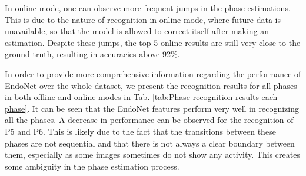 \documentclass[journal]{IEEEtran} \usepackage{amssymb}
\begin{document}
In online mode, one can observe more frequent jumps in the phase estimations. This is due to the nature of recognition in online mode, where future data is unavailable, so that the model is allowed to correct itself after making an estimation. Despite these jumps, the top-5 online results are still very close to the ground-truth, resulting in accuracies above 92\%.

In order to provide more comprehensive information regarding the performance of EndoNet over the whole dataset, we present the recognition results for all phases in both offline and online modes in Tab. \ref{tab:Phase-recognition-results-each-phase}. It can be seen that the EndoNet features perform very well in recognizing all the phases. A decrease in performance can be observed for the recognition of P5 and P6. 
This is likely due to the fact that the transitions between these phases are not sequential and that there is not always a clear boundary between them, especially as some images sometimes do not show any activity. This creates some ambiguity in the phase estimation process.
\end{document}
